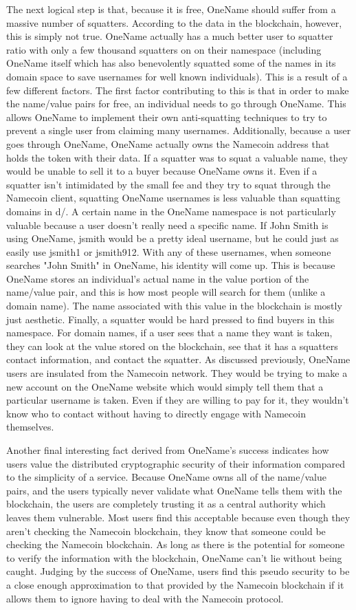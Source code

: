 The next logical step is that, because it is free, OneName should suffer from a massive number of squatters. According to the data in the blockchain, however, this is simply not true. OneName actually has a much better user to squatter ratio with only a few thousand squatters on on their namespace (including OneName itself which has also benevolently squatted some of the names in its domain space to save usernames for well known individuals). This is a result of a few different factors. The first factor contributing to this is that in order to make the name/value pairs for free, an individual needs to go through OneName. This allows OneName to implement their own anti-squatting techniques to try to prevent a single user from claiming many usernames. Additionally, because a user goes through OneName, OneName actually owns the Namecoin address that holds the token with their data. If a squatter was to squat a valuable name, they would be unable to sell it to a buyer because OneName owns it. Even if a squatter isn't intimidated by the small fee and they try to squat through the Namecoin client, squatting OneName usernames is less valuable than squatting domains in d/. A certain name in the OneName namespace is not particularly valuable because a user doesn't really need a specific name. If John Smith is using OneName, jsmith would be a pretty ideal username, but he could just as easily use jsmith1 or jsmith912. With any of these usernames, when someone searches "John Smith" in OneName, his identity will come up. This is because OneName stores an individual's actual name in the value portion of the name/value pair, and this is how most people will search for them (unlike a domain name). The name associated with this value in the blockchain is mostly just aesthetic. Finally, a squatter would be hard pressed to find buyers in this namespace. For domain names, if a user sees that a name they want is taken, they can look at the value stored on the blockchain, see that it has a squatters contact information, and contact the squatter. As discussed previously, OneName users are insulated from the Namecoin network. They would be trying to make a new account on the OneName website which would simply tell them that a particular username is taken. Even if they are willing to pay for it, they wouldn't know who to contact without having to directly engage with Namecoin themselves. 

Another final interesting fact derived from OneName's success indicates how users value the distributed cryptographic security of their information compared to the simplicity of a service. Because OneName owns all of the name/value pairs, and the users typically never validate what OneName tells them with the blockchain, the users are completely trusting it as a central authority which leaves them vulnerable. Most users find this acceptable because even though they aren't checking the Namecoin blockchain, they know that someone could be checking the Namecoin blockchain. As long as there is the potential for someone to verify the information with the blockchain, OneName can't lie without being caught. Judging by the success of OneName, users find this pseudo security to be a close enough approximation to that provided by the Namecoin blockchain if it allows them to ignore having to deal with the Namecoin protocol. 
